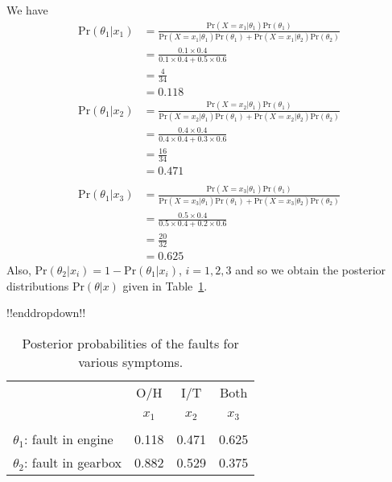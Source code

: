 {    We have
    \begin{align*}
    \text{Pr}(\theta_1|x_1)
    &=\frac{\text{Pr}(X=x_1|\theta_1)\text{Pr}(\theta_1)}
    {\text{Pr}(X=x_1|\theta_1)\text{Pr}(\theta_1)+\text{Pr}(X=x_1|\theta_2)\text{Pr}(\theta_2)} \\
    &=\frac{0.1\times 0.4}{0.1\times 0.4+0.5\times 0.6} \\
    &=\frac{4}{34} \\
    &=0.118
    \end{align*}
    \begin{align*}
    \text{Pr}(\theta_1|x_2)
    &=\frac{\text{Pr}(X=x_2|\theta_1)\text{Pr}(\theta_1)}
    {\text{Pr}(X=x_2|\theta_1)\text{Pr}(\theta_1)+\text{Pr}(X=x_2|\theta_2)\text{Pr}(\theta_2)} \\
    &=\frac{0.4\times 0.4}{0.4\times 0.4+0.3\times 0.6} \\
    &=\frac{16}{34} \\
    &=0.471 \\ \\
    \text{Pr}(\theta_1|x_3)
    &=\frac{\text{Pr}(X=x_3|\theta_1)\text{Pr}(\theta_1)}
    {\text{Pr}(X=x_3|\theta_1)\text{Pr}(\theta_1)+\text{Pr}(X=x_3|\theta_2)\text{Pr}(\theta_2)} \\
    &=\frac{0.5\times 0.4}{0.5\times 0.4+0.2\times 0.6} \\
    &=\frac{20}{32} \\
    &=0.625
    \end{align*}
    Also, $\text{Pr}(\theta_2|x_i)=1-\text{Pr}(\theta_1|x_i)$, $i=1,2,3$ and so we
    obtain the posterior distributions $\text{Pr}(\theta|x)$ given in
    Table~\ref{tab:garagepost}.

!!enddropdown!!

\begin{table}[!h]
\bigskip

\begin{tabular}{|l|c|c|c|}
\cline{2-4}
\multicolumn{1}{c|}{~}& O/H & I/T & Both \\
\multicolumn{1}{c|}{~}& $x_1$ & $x_2$ & $x_3$ \\
\hline
$\theta_1$: fault in engine & 0.118 & 0.471 & 0.625 \\
$\theta_2$: fault in gearbox & 0.882 & 0.529 & 0.375 \\
\hline
\end{tabular}
\caption{Posterior probabilities of the faults for various symptoms.}
\label{tab:garagepost}

\end{table}

}
